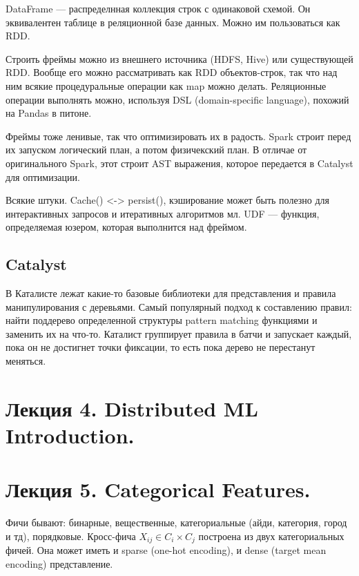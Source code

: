 \documentclass[12pt]{article}
\begin{document}
DataFrame --- распределнная коллекция строк с одинаковой схемой. Он эквивалентен таблице в реляционной базе данных. Можно им пользоваться как RDD.

Строить фреймы можно из внешнего источника (HDFS, Hive) или существующей RDD. Вообще его можно рассматривать как RDD объектов-строк, так что над ним всякие процедуральные операции как map можно делать. Реляционные операции выполнять можно, используя DSL (domain-specific language), похожий на Pandas в питоне.

Фреймы тоже ленивые, так что оптимизировать их в радость. Spark строит перед их запуском логический план, а потом физичекский план. В отличае от оригинального Spark, этот строит AST выражения, которое передается в Catalyst для оптимизации.

Всякие штуки. Cache() <-> persist(), кэширование может быть полезно для интерактивных запросов и итеративных алгоритмов мл. UDF --- функция, определяемая юзером, которая выполнится над фреймом. 

\subsection{Catalyst}

В Каталисте лежат какие-то базовые библиотеки для представления и правила манипулирования с деревьями. Самый популярный подход к составлению правил: найти поддерево определенной структуры pattern matching функциями и заменить их на что-то. Каталист группирует правила в батчи и запускает каждый, пока он не достигнет точки фиксации, то есть пока дерево не перестанут меняться.

\section{Лекция 4. Distributed ML Introduction.}



\section{Лекция 5. Categorical Features.}  

Фичи бывают: бинарные, вещественные, категориальные (айди, категория, город и тд), порядковые. Кросс-фича $X_{ij} \in C_i \times C_j$ построена из двух категориальных фичей. Она может иметь и sparse (one-hot encoding), и dense (target mean encoding) представление. 
\end{document}
